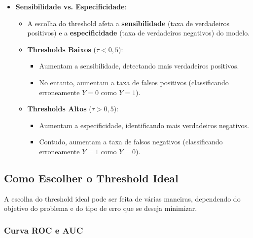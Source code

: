 \documentclass{sciposter}
\begin{document}
\begin{multicols}{3}
\begin{itemize}
    \item \textbf{Sensibilidade vs. Especificidade}:
    \begin{itemize}
        \item A escolha do threshold afeta a \textbf{sensibilidade} (taxa de verdadeiros positivos) e a \textbf{especificidade} (taxa de verdadeiros negativos) do modelo.
        \item \textbf{Thresholds Baixos} ($\tau < 0{,}5$):
        \begin{itemize}
            \item Aumentam a sensibilidade, detectando mais verdadeiros positivos.
            \item No entanto, aumentam a taxa de falsos positivos (classificando erroneamente $Y=0$ como $Y=1$).
        \end{itemize}
        \item \textbf{Thresholds Altos} ($\tau > 0{,}5$):
        \begin{itemize}
            \item Aumentam a especificidade, identificando mais verdadeiros negativos.
            \item Contudo, aumentam a taxa de falsos negativos (classificando erroneamente $Y=1$ como $Y=0$).
        \end{itemize}
    \end{itemize}
\end{itemize}

\subsection{Como Escolher o Threshold Ideal}

A escolha do threshold ideal pode ser feita de várias maneiras, dependendo do objetivo do problema e do tipo de erro que se deseja minimizar.

\subsubsection{Curva ROC e AUC}


\end{multicols}
\end{document}
